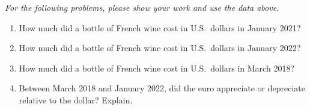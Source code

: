 \documentclass{assignment}
\begin{document}
\vfill

\clearpage

\emph{For the following problems, please show your work and use the data above.}

\begin{enumerate}

\item How much did a bottle of French wine cost in U.S.~dollars in January 2021?

\vfill

\item How much did a bottle of French wine cost in U.S.~dollars in January 2022?

\vfill

\item How much did a bottle of French wine cost in U.S.~dollars in March 2018?

\vfill

\item Between March 2018 and January 2022, did the euro appreciate or depreciate relative to the dollar? Explain.

\vfill

\end{enumerate}
\end{document}
